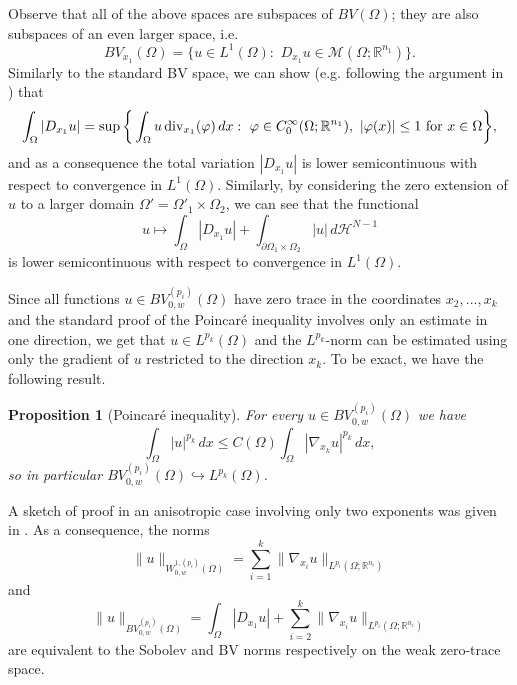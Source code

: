 \documentclass[reqno,12pt]{amsart}
\newtheorem{proposition}[theorem]{Proposition}
\def\R{\mathbb R}
\numberwithin{equation}{section}
\begin{document}
Observe that all of the above spaces are subspaces of $BV(\Omega)$; they are also subspaces of an even larger space, i.e.
\begin{equation}
BV_{x_1}(\Omega) = \bigg\{ u \in L^1(\Omega): \,\, D_{x_1} u \in \mathcal{M}(\Omega; \R^{n_1}) \bigg\}.
\end{equation}
Similarly to the standard BV space, we can show (e.g. following the argument in \cite{AFP}) that
\begin{equation}\label{dfn:tvonx1}
\int_\Omega |D_{x_1} u| = \sup \bigg\{ \int_{\Omega} u \, \mathrm{div}_{x_1} (\varphi) \, dx: \,\, \varphi \in C^{\infty}_{0}(\Omega; \R^{n_1}), \,\, |\varphi(x)| \leq 1
\, \, \hbox{for $x \in \Omega$} \bigg\},
\end{equation}
and as a consequence the total variation $|D_{x_1} u|$ is lower semicontinuous with respect to convergence in $L^1(\Omega)$. Similarly, by considering the zero extension of $u$ to a larger domain $\Omega' = \Omega'_1 \times \Omega_2$, we can see that the functional
\begin{equation*}
u \mapsto \int_\Omega |D_{x_1} u| + \int_{\partial\Omega_1 \times \Omega_2} |u| \, d\mathcal{H}^{N-1}
\end{equation*}
is lower semicontinuous with respect to convergence in $L^1(\Omega)$.

Since all functions $u \in BV_{0,w}^{(p_i)}(\Omega)$ have zero trace in the coordinates $x_2, ..., x_k$ and the standard proof of the Poincar\'e inequality involves only an estimate in one direction, we get that $u \in L^{p_k}(\Omega)$ and the $L^{p_k}$-norm can be estimated using only the gradient of $u$ restricted to the direction $x_k$. To be exact, we have the following result.

\begin{proposition}[Poincar\'e inequality]\label{prop:poincare}
For every $u \in BV_{0,w}^{(p_i)}(\Omega)$ we have
\begin{equation}
\int_\Omega |u|^{p_k} \, dx \leq C(\Omega) \int_\Omega |\nabla_{x_k} u|^{p_k} \, dx,
\end{equation}
so in particular $BV_{0,w}^{(p_i)}(\Omega) \hookrightarrow L^{p_k}(\Omega)$.
\end{proposition}

A sketch of proof in an anisotropic case involving only two exponents was given in \cite[Theorem 2.3]{MRST}. As a consequence, the norms
\begin{equation}
\| u \|_{W_{0,w}^{1,(p_i)}(\Omega)} = \sum_{i=1}^k \| \nabla_{x_i} u \|_{L^{p_i}(\Omega; \R^{n_i})}
\end{equation}
and
\begin{equation}
\| u \|_{BV_{0,w}^{(p_i)}(\Omega)} = \int_\Omega |D_{x_1} u| + \sum_{i=2}^k \| \nabla_{x_i} u \|_{L^{p_i}(\Omega; \R^{n_i})}
\end{equation}
are equivalent to the Sobolev and BV norms respectively on the weak zero-trace space. 
\end{document}
